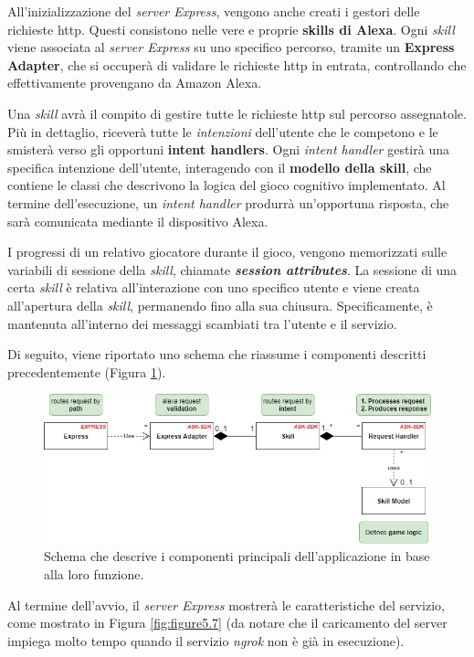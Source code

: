 All’inizializzazione del \textit{server Express}, vengono anche creati i
gestori delle richieste http. Questi consistono nelle vere e proprie
\textbf{skills di Alexa}. Ogni \textit{skill} viene associata al \textit{server
Express} su uno specifico percorso, tramite un \textbf{Express Adapter}, che si
occuperà di validare le richieste http in entrata, controllando che
effettivamente provengano da Amazon Alexa.

Una \textit{skill} avrà il compito di gestire tutte le richieste http sul
percorso assegnatole. Più in dettaglio, riceverà tutte le \textit{intenzioni}
dell’utente che le competono e le smisterà verso gli opportuni \textbf{intent
handlers}. Ogni \textit{intent handler} gestirà una specifica intenzione
dell’utente, interagendo con il \textbf{modello della skill}, che contiene le
classi che descrivono la logica del gioco cognitivo implementato. Al termine
dell’esecuzione, un \textit{intent handler} produrrà un’opportuna risposta, che
sarà comunicata mediante il dispositivo Alexa.

I progressi di un relativo giocatore durante il gioco, vengono memorizzati
sulle variabili di sessione della \textit{skill}, chiamate
\textit{\textbf{session attributes}}. La sessione di una certa \textit{skill} è
relativa all’interazione con uno specifico utente e viene creata all’apertura
della \textit{skill}, permanendo fino alla sua chiusura. Specificamente, è
mantenuta all’interno dei messaggi scambiati tra l’utente e il servizio.

Di seguito, viene riportato uno schema che riassume i componenti descritti
precedentemente (Figura \ref{fig:figure5.6}).
\begin{figure}[!ht]
  \centering
  \includegraphics[scale=0.6]{resources/images/implementation/project-class-diagram.jpg}
  \caption{
    Schema che descrive i componenti principali dell'applicazione in base alla
    loro funzione.
  }
  \label{fig:figure5.6}
\end{figure}

Al termine dell’avvio, il \textit{server Express} mostrerà le caratteristiche
del servizio, come mostrato in Figura \ref{fig:figure5.7} (da notare che il
caricamento del server impiega molto tempo quando il servizio \textit{ngrok}
non è già in esecuzione).

